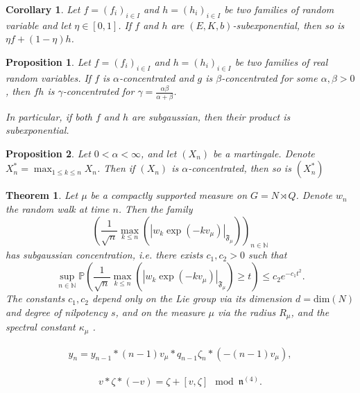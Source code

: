 \documentclass[10pt,a4paper]{amsart}
\newtheorem{proposition}{Proposition}
\newtheorem{corollary}{Corollary}
\newtheorem{theorem}{Theorem}
\begin{document}
\begin{corollary}\label{cor:convexSubExp} 
Let $f=(f_{i})_{i\in I}$ and $h=(h_{i})_{i\in I}$ be two families
of random variable and let $\eta\in[0,1]$. If $f$ and $h$ are $(E,K,b)$-subexponential,
then so is $\eta f+(1-\eta)h$.
\end{corollary}

\begin{proposition}\label{prop:products} Let $f=(f_{i})_{i\in I}$
and $h=(h_{i})_{i\in I}$ be two families of real random variables.
If $f$ is $\alpha$-concentrated and $g$ is $\beta$-concentrated
for some $\alpha,\beta>0$, then $fh$ is $\gamma$-concentrated for
$\gamma=\frac{\alpha\beta}{\alpha+\beta}$. 

In particular, if both
$f$ and $h$ are subgaussian, then their product is subexponential.
\end{proposition} 

\begin{proposition}\label{prop:MaxConcentrated} Let $0<\alpha<\infty$,
and let $(X_{n})$ be a martingale. Denote $X_{n}^{*}=\max_{1\leq k\leq n}X_{n}$.
Then if $(X_{n})$ is $\alpha$-concentrated, then so is $(X_{n}^{*})$
\end{proposition} 

\begin{theorem}\label{thm:norm} Let $\mu$ be a compactly supported measure on $G=N \rtimes Q$. Denote $w_n$ the random walk at time $n$. Then the family
\[
\left( \frac{1}{\sqrt{n}}\max_{k\le n}\left(\left|w_k\exp\left(-kv_{\mu}\right)\right|_{\mathfrak{F}_\mu}\right) \right)_{n\in \mathbb{N}}
\]
has subgaussian concentration, i.e. there exists $c_1,c_2>0$ such that
\[
\sup_{n\in \mathbb{N}} \mathbb{P} \left( \frac{1}{\sqrt{n}}\max_{k\le n}\left(\left|w_k\exp\left(-kv_{\mu}\right)\right|_{\mathfrak{F}_\mu}\right) \ge t\right) \le c_2e^{-c_1t^2}.
\]
The constants $c_1,c_2$ depend only on the Lie group via its dimension $d=\mathrm{dim}(N)$ and degree of nilpotency $s$, and on the measure $\mu$ via  the radius $R_\mu$, and the spectral constant $\kappa_\mu$ .
\end{theorem}

\begin{align}\label{eq:increment}
y_n=y_{n-1}\ast (n-1)v_\mu \ast q_{n-1}\zeta_n\ast \left( -(n-1)v_\mu\right),
\end{align}

\begin{align}\label{eq:modn4}
v\ast\zeta\ast(-v) = \zeta+[v,\zeta] \mod \mathfrak{n}^{(4)}.
\end{align}
\end{document}
